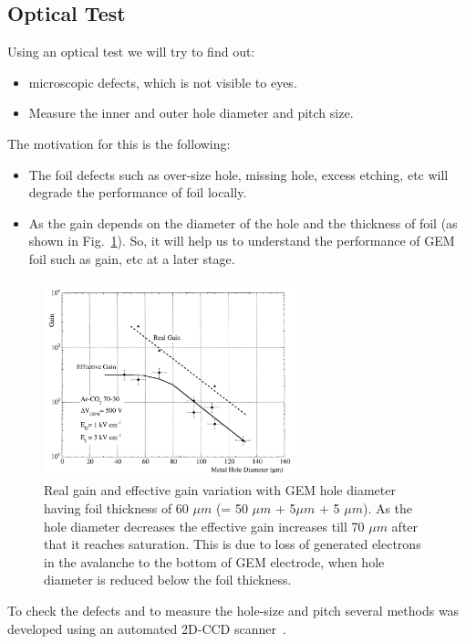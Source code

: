 \subsection{Optical Test} %
\label{sub:optical_test}
Using an optical test we will try to find out:
\begin{itemize}
    \item microscopic defects, which is not visible to eyes.
    \item Measure the inner and outer hole diameter and pitch size.
\end{itemize}
The motivation for this is the following:
\begin{itemize}
    \item The foil defects such as over-size hole, missing hole, excess etching, etc will degrade the performance of foil locally.
    \item As the gain depends on the diameter of the hole and the thickness of foil (as shown in Fig.~\ref{fig:gain-vs-holediameter}). So, it will help us to understand the performance of GEM foil such as gain, etc at a later stage.
\end{itemize}
\begin{figure}[htbp]
    \centering
    \includegraphics[width=0.65\textwidth]{figures/GEM/Gain_Vs_Hole_Diameter.png}
    \caption{Real gain and effective gain variation with GEM hole diameter~\cite{Bachmann1999} having foil thickness of 60 $\mu m$ (= 50 $\mu m$ + 5$ \mu m$ + 5 $\mu m$). As the hole diameter decreases the effective gain increases till 70 $\mu m$ after that it reaches saturation. This is due to loss of generated electrons in the avalanche to the bottom of GEM electrode, when hole diameter is reduced below the foil thickness.}
    \label{fig:gain-vs-holediameter}
\end{figure}
To check the defects and to measure the hole-size and pitch several methods was developed using an automated 2D-CCD scanner~\cite{Posik2015, Becker2006}. 
